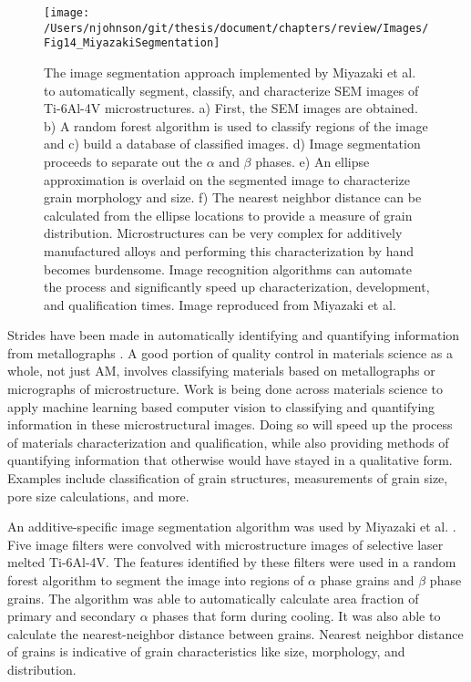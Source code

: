 \begin{figure*}
	\texttt{[image: /Users/njohnson/git/thesis/document/chapters/review/Images/Fig14\_MiyazakiSegmentation]}
	\caption{The image segmentation approach implemented by Miyazaki et al. to automatically segment, classify, and characterize SEM images of Ti-6Al-4V microstructures. a) First, the SEM images are obtained. b) A random forest algorithm is used to classify regions of the image and c) build a database of classified images. d) Image segmentation proceeds to separate out the $\alpha$ and $\beta$ phases. e) An ellipse approximation is overlaid on the segmented image to characterize grain morphology and size. f) The nearest neighbor distance can be calculated from the ellipse locations to provide a measure of grain distribution. Microstructures can be very complex for additively manufactured alloys and performing this characterization by hand becomes burdensome. Image recognition algorithms can automate the process and significantly speed up characterization, development, and qualification times. Image reproduced from Miyazaki et al\cite{Miyazaki2019}.}
	\label{MiyazakiSegementation}
\end{figure*}

Strides have been made in automatically identifying and quantifying information from metallographs \cite{DeCost2015, DeCost2017b, Ling2017a, Bulgarevich2018}. A good portion of quality control in materials science as a whole, not just AM, involves classifying materials based on metallographs or micrographs of microstructure. Work is being done across materials science to apply machine learning based computer vision to classifying and quantifying information in these microstructural images. Doing so will speed up the process of materials characterization and qualification, while also providing methods of quantifying information that otherwise would have stayed in a qualitative form. Examples include classification of grain structures, measurements of grain size, pore size calculations, and more. 

An additive-specific image segmentation algorithm was used by Miyazaki et al. \cite{Miyazaki2019}. Five image filters were convolved with microstructure images of selective laser melted Ti-6Al-4V. The features identified by these filters were used in a random forest algorithm to segment the image into regions of $\alpha$ phase grains and $\beta$ phase grains. The algorithm was able to automatically calculate area fraction of primary and secondary $\alpha$ phases that form during cooling. It was also able to calculate the nearest-neighbor distance between grains. Nearest neighbor distance of grains is indicative of grain characteristics like size, morphology, and distribution. 

